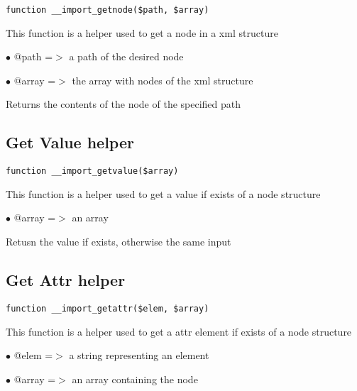 \documentclass[a4paper]{book}
\begin{document}
\begin{lstlisting}
function __import_getnode($path, $array)
\end{lstlisting}

This function is a helper used to get a node in a xml structure

\begin{compactitem}
\item[\color{myblue}$\bullet$] @path  =$>$ a path of the desired node
\item[\color{myblue}$\bullet$] @array =$>$ the array with nodes of the xml structure
\end{compactitem}

Returns the contents of the node of the specified path

\hypertarget{toc159}{}
\subsection{Get Value helper}

\begin{lstlisting}
function __import_getvalue($array)
\end{lstlisting}

This function is a helper used to get a value if exists of a node structure

\begin{compactitem}
\item[\color{myblue}$\bullet$] @array =$>$ an array
\end{compactitem}

Retusn the value if exists, otherwise the same input

\hypertarget{toc160}{}
\subsection{Get Attr helper}

\begin{lstlisting}
function __import_getattr($elem, $array)
\end{lstlisting}

This function is a helper used to get a attr element if exists of a node structure

\begin{compactitem}
\item[\color{myblue}$\bullet$] @elem  =$>$ a string representing an element
\item[\color{myblue}$\bullet$] @array =$>$ an array containing the node
\end{compactitem}
\end{document}
